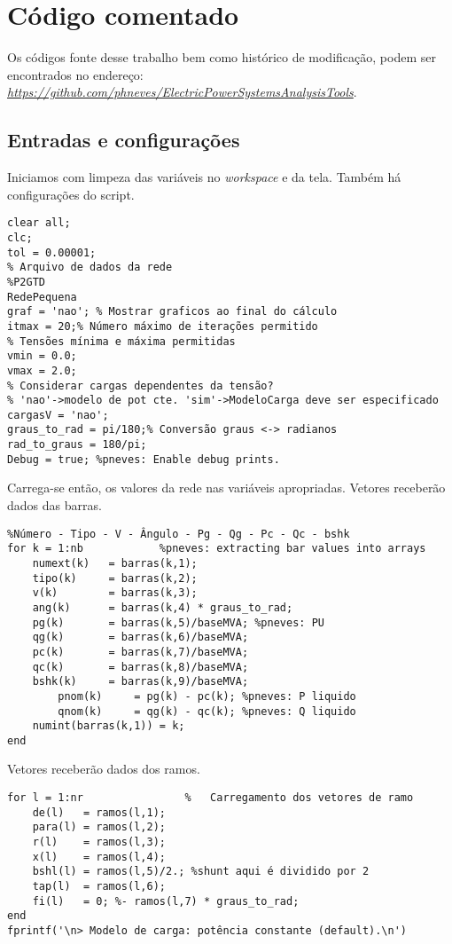 \chapter{C\'odigo comentado}
\label{SectionCodigo}

Os códigos fonte desse trabalho bem como histórico de modificação, podem ser encontrados no endereço: \textit{\href{https://github.com/phneves/ElectricPowerSystemsAnalysisTools}{https://github.com/phneves/ElectricPowerSystemsAnalysisTools}}.
\section{Entradas e configurações}
Iniciamos com limpeza das variáveis no \textit{workspace} e da tela. Também há configurações do script.
\begin{verbatim}
clear all;
clc;
tol = 0.00001; 
% Arquivo de dados da rede
%P2GTD
RedePequena
graf = 'nao'; % Mostrar graficos ao final do cálculo
itmax = 20;% Número máximo de iterações permitido
% Tensões mínima e máxima permitidas
vmin = 0.0;
vmax = 2.0;
% Considerar cargas dependentes da tensão?
% 'nao'->modelo de pot cte. 'sim'->ModeloCarga deve ser especificado
cargasV = 'nao';
graus_to_rad = pi/180;% Conversão graus <-> radianos
rad_to_graus = 180/pi;
Debug = true; %pneves: Enable debug prints.
\end{verbatim}
Carrega-se então, os valores da rede nas variáveis apropriadas. Vetores receberão dados das barras.
\begin{verbatim}
%Número - Tipo - V - Ângulo - Pg - Qg - Pc - Qc - bshk
for k = 1:nb            %pneves: extracting bar values into arrays
    numext(k)   = barras(k,1);                  
    tipo(k)     = barras(k,2);                  
    v(k)        = barras(k,3);                  
    ang(k)      = barras(k,4) * graus_to_rad;   
    pg(k)       = barras(k,5)/baseMVA; %pneves: PU 
    qg(k)       = barras(k,6)/baseMVA;
    pc(k)       = barras(k,7)/baseMVA;
    qc(k)       = barras(k,8)/baseMVA;
    bshk(k)     = barras(k,9)/baseMVA;
        pnom(k)     = pg(k) - pc(k); %pneves: P liquido
        qnom(k)     = qg(k) - qc(k); %pneves: Q liquido
    numint(barras(k,1)) = k;
end
\end{verbatim}
Vetores receberão dados dos ramos.
\begin{verbatim}
for l = 1:nr                %	Carregamento dos vetores de ramo
	de(l)   = ramos(l,1);
	para(l) = ramos(l,2);
	r(l)    = ramos(l,3);
	x(l)    = ramos(l,4);
	bshl(l) = ramos(l,5)/2.; %shunt aqui é dividido por 2
	tap(l)  = ramos(l,6);
	fi(l)   = 0; %- ramos(l,7) * graus_to_rad;
end
fprintf('\n> Modelo de carga: potência constante (default).\n')
\end{verbatim}
